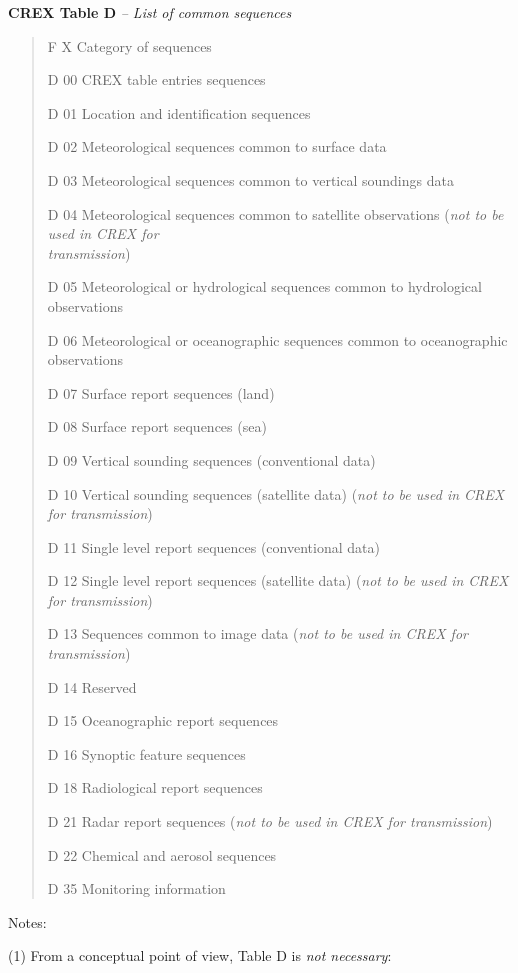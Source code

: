 \textbf{CREX Table D} \emph{-- List of common sequences}

\begin{quote}
F X Category of sequences

D 00 CREX table entries sequences

D 01 Location and identification sequences

D 02 Meteorological sequences common to surface data

D 03 Meteorological sequences common to vertical soundings data

D 04 Meteorological sequences common to satellite observations (\emph{not to be used in CREX for\\
transmission})

D 05 Meteorological or hydrological sequences common to hydrological observations

D 06 Meteorological or oceanographic sequences common to oceanographic observations

D 07 Surface report sequences (land)

D 08 Surface report sequences (sea)

D 09 Vertical sounding sequences (conventional data)

D 10 Vertical sounding sequences (satellite data) (\emph{not to be used in CREX for transmission})

D 11 Single level report sequences (conventional data)

D 12 Single level report sequences (satellite data) (\emph{not to be used in CREX for transmission})

D 13 Sequences common to image data (\emph{not to be used in CREX for transmission})

D 14 Reserved

D 15 Oceanographic report sequences

D 16 Synoptic feature sequences

D 18 Radiological report sequences

D 21 Radar report sequences (\emph{not to be used in CREX for transmission})

D 22 Chemical and aerosol sequences

D 35 Monitoring information
\end{quote}

Notes:

(1) From a conceptual point of view, Table D is \emph{not necessary}:

